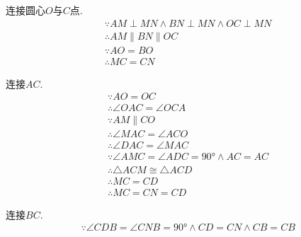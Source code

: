 \begin{questions}
\begin{proofsolution}
\begin{center}
		\end{center}
		\begin{penum}
			\item
			      \begin{cenum}
				      \item 连接圆心$O$与$C$点.
				            \begin{align*}
					             & \because AM \perp MN \land BN \perp MN  \land OC \perp MN \\
					             & \therefore AM \parallel BN \parallel OC                   \\
					             & \because AO = BO                                          \\
					             & \therefore MC = CN
				            \end{align*}
				      \item	连接$AC$.
				            \begin{align*}
					             & \because AO = OC                                            \\
					             & \therefore \angle{OAC} = \angle{OCA}                        \\
					             & \because AM \parallel CO                                    \\
					             & \therefore \angle{MAC} = \angle{ACO}                        \\
					             & \therefore \angle{DAC} = \angle{MAC}                        \\
					             & \because \angle{AMC} = \angle{ADC} = \ang{90} \land AC = AC \\
					             & \therefore \triangle{ACM} \cong \triangle{ACD}              \\
					             & \therefore MC = CD                                          \\
					             & \therefore MC = CN = CD
				            \end{align*}
			      \end{cenum}
			\item 连接$BC$.
			      \begin{align*}
				       & \because \angle{CDB} = \angle{CNB} = \ang{90} \land CD = CN \land CB = CB                   \\

\end{align*}
\end{penum}
\end{proofsolution}
\end{questions}
